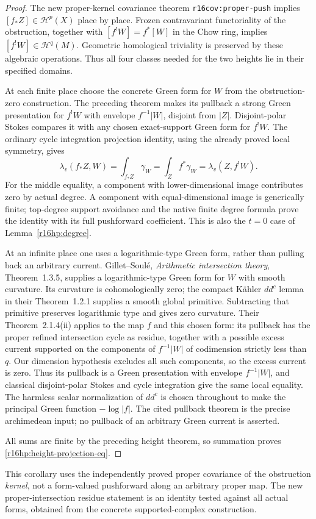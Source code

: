 \begin{proof}
The new proper-kernel covariance theorem
\texttt{r16cov:proper-push} implies
$[f_*Z]\in\mathcal H^p(X)$ place by place. Frozen
contravariant functoriality of the obstruction, together with
$[f^!W]=f^*[W]$ in the Chow ring, implies
$[f^!W]\in\mathcal H^q(M)$. Geometric homological triviality
is preserved by these algebraic operations. Thus all four
classes needed for the two heights lie in their specified domains.

At each finite place choose the concrete Green form for $W$ from
the obstruction-zero construction. The preceding theorem makes its
pullback a strong Green presentation for $f^!W$ with envelope
$f^{-1}|W|$, disjoint from $|Z|$. Disjoint-polar Stokes compares
it with any chosen exact-support Green form for $f^!W$. The
ordinary cycle integration projection identity, using the already
proved local symmetry, gives
\[
 \lambda_v(f_*Z,W)=\int_{f_*Z}\gamma_W
                  =\int_Z f^*\gamma_W
                  =\lambda_v(Z,f^!W).
\]
For the middle equality, a component with lower-dimensional image
contributes zero by actual degree. A component with equal-dimensional
image is generically finite; top-degree support avoidance and the
native finite degree formula prove the identity with its full
pushforward coefficient. This is also the $t=0$ case of
Lemma~\ref{r16hp:degree}.

At an infinite place one uses a logarithmic-type Green form, rather
than pulling back an arbitrary current. Gillet--Soul\'e,
\emph{Arithmetic intersection theory}, Theorem~1.3.5, supplies a
logarithmic-type Green form for $W$ with smooth curvature. Its
curvature is cohomologically zero; the compact K\"ahler
$dd^c$ lemma in their Theorem~1.2.1 supplies a smooth global
primitive. Subtracting that primitive preserves logarithmic type
and gives zero curvature. Their Theorem~2.1.4(ii) applies to the
map $f$ and this chosen form: its pullback has the proper refined
intersection cycle as residue, together with a possible excess
current supported on the components of $f^{-1}|W|$ of codimension
strictly less than $q$. Our dimension hypothesis excludes all such
components, so the excess current is zero. Thus its pullback is a
Green presentation with envelope $f^{-1}|W|$, and classical
disjoint-polar Stokes and cycle integration give the same local
equality. The harmless scalar normalization of $dd^c$ is chosen
throughout to make the principal Green function $-\log|f|$.
The cited pullback theorem is the precise archimedean input;
no pullback of an arbitrary Green current is asserted.

All sums are finite by the preceding height theorem, so summation
proves \eqref{r16hp:height-projection-eq}.
\end{proof}

This corollary uses the independently proved proper covariance of
the obstruction \emph{kernel}, not a form-valued pushforward along
an arbitrary proper map. The new proper-intersection residue statement is an
identity tested against all actual forms, obtained from the concrete
supported-complex construction.

